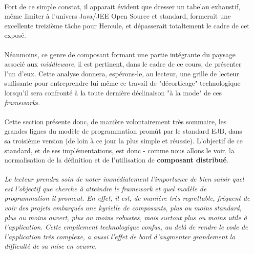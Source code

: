 {   \paragraph{} Fort de ce simple constat, il apparait évident que dresser un tabelau exhaustif,
   même limiter à l'univers Java/JEE Open Source et standard, formerait une excellente treizième
   tâche pour Hercule, et dépasserait totaltement le cadre de cet exposé.

   \paragraph{} Néanmoins, ce genre de composant formant une partie intégrante du paysage associé
   aux \textit{middleware}, il est pertinent, dans le cadre de ce cours, de présenter l'un d'eux. Cette
   analyse donnera, espérons-le, au lecteur, une grille de lecteur suffisante pour entreprendre lui
   même ce travail de "décorticage" technologique lorsqu'il sera confronté à la toute dernière
   déclinaison "à la mode" de ces \textit{frameworks}.

   \paragraph{} Cette section présente donc, de manière volontairement très sommaire, les grandes
   lignes du modèle de programmation promût par le standard EJB, dans sa troisième version (de loin
   à ce jour la plus simple et réussie). L'objectif de ce standard, et de ses implémentations, est
   donc - comme nous allons le voir, la normalisation de la définition et de l'utilisation de
   \textbf{composant distribué}.

   \paragraph{} \textit{Le lecteur prendra soin de noter immédiatement l'importance de bien saisir
   quel est l'objectif que cherche à atteindre le framework et quel modèle de programmation
   il promeut. En effet, il est, de manière très regrettable, fréquent de
   voir des projets embarqués une kyrielle de composants, plus ou moins standard, plus ou moins
   ouvert, plus ou moins robustes, mais surtout plus ou moins utile à l'application. Cette
   empilement technologique confus, au delà de rendre le code de l'application très complexe, a
   aussi l'effet de bord d'augmenter grandement la difficulté de sa mise en oeuvre.}


}
